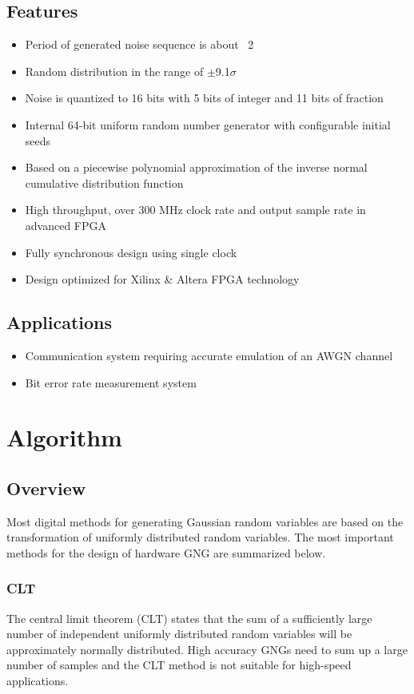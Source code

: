 \documentclass[a4paper, titlepage]{article}
\begin{document}
\subsection{Features}
\begin{itemize}
    \item Period of generated noise sequence is about \si{2}
    \item Random distribution in the range of $\pm$9.1$\sigma$
    \item Noise is quantized to 16 bits with 5 bits of integer
        and 11 bits of fraction
    \item Internal 64-bit uniform random number generator with
        configurable initial seeds
    \item Based on a piecewise polynomial approximation of
        the inverse normal cumulative distribution function
    \item High throughput, over 300 MHz clock rate and
        output sample rate in advanced FPGA
    \item Fully synchronous design using single clock
    \item Design optimized for Xilinx \& Altera FPGA technology
\end{itemize}

\subsection{Applications}
\begin{itemize}
    \item Communication system requiring accurate emulation of an AWGN channel
    \item Bit error rate measurement system
\end{itemize}


\section{Algorithm}

\subsection{Overview}
Most digital methods for generating Gaussian random variables are
based on the transformation of uniformly distributed random variables.
The most important methods for the design of hardware GNG are summarized below.

\subsubsection{CLT}
The central limit theorem (CLT) states that the sum of
a sufficiently large number of independent uniformly
distributed random variables will be approximately normally distributed.
High accuracy GNGs need to sum up a large number of samples and
the CLT method is not suitable for high-speed applications.
\end{document}
